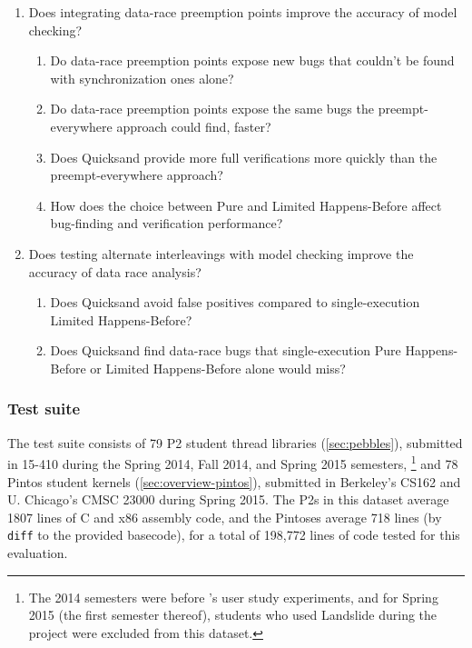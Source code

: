\begin{enumerate}
	\item Does integrating data-race preemption points improve the accuracy of model checking?
		\begin{enumerate}
			\item Do data-race preemption points expose new bugs that couldn't be found with
				synchronization ones alone?
			\item Do data-race preemption points expose the same bugs
				the preempt-everywhere approach could find, faster?
			\item Does Quicksand provide more full verifications %
				more quickly than the preempt-everywhere approach?
			\item How does the choice between Pure and Limited Happens-Before
				affect bug-finding and verification performance?
		\end{enumerate}
	\item Does testing alternate interleavings with model checking improve the accuracy of data race analysis?
		\begin{enumerate}
			\item Does Quicksand avoid false positives compared to single-execution Limited Happens-Before?
			\item Does Quicksand find data-race bugs that single-execution Pure Happens-Before or Limited Happens-Before alone would miss?
		\end{enumerate}
\end{enumerate}

\subsubsection{Test suite}

The test suite consists of 79 P2 student thread libraries (\cref{sec:pebbles}),
submitted in 15-410 during the Spring 2014, Fall 2014, and Spring 2015 semesters,%
\footnote{The 2014 semesters were before 's user study experiments,
and for Spring 2015 (the first semester thereof),
students who used Landslide during the project were excluded from this dataset.}
and 78 Pintos student kernels (\cref{sec:overview-pintos}),
submitted in Berkeley's CS162 and U. Chicago's CMSC 23000 during Spring 2015.
The P2s in this dataset average 1807 lines of C and x86 assembly code,
and the Pintoses average 718 lines (by {\tt diff} to the provided basecode),
for a total of 198,772 lines of code tested for this evaluation.

